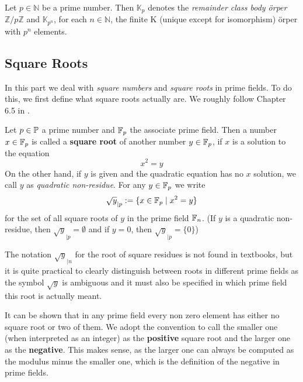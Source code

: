 \begin{definition} Let $ p \in \mathbb{N} $ be a prime number. Then $ \mathbb{K} _p $ denotes the \textit{remainder class body \"orper} $ \mathbb{ Z} / p \mathbb{Z} $ and $ \mathbb{K} _{p ^ n} $, for each $ n \in \mathbb{N} $, the finite K (unique except for isomorphism) \"orper with $ p ^ n $ elements.
\end{definition} 

\subsection{Square Roots}
In this part we deal with \textit{square numbers} and \textit{square roots} in prime fields. To do this, we first define what square roots actually are. We roughly follow Chapter 6.5 in \cite{HW}.
\begin{definition} Let
$p \in \mathbb{P} $ a prime number and $\mathbb{F}_p $ the associate prime field. Then a number $x\in \mathbb{F}_p$ is called a \textbf{square root} of another number $y\in\mathbb{F}_p$, if $x$ is a solution to the equation
\begin{equation}
x^2 = y
\end{equation}
On the other hand, if $y$ is given and the quadratic equation has no $x$ solution, we call $ y $ as \textit{quadratic non-residue}. For any $ y \in \mathbb{F}_p $ we write
\begin{equation}
\sqrt{y} _{| p}: = \{x \in \mathbb{F}_p \; | \; x^2 = y \}
\end{equation}
for the set of all square roots of $ y $ in the prime field
$ \mathbb{F}_n $. (If $ y $ is a quadratic non-residue, then $ \sqrt{y}_{| p} = \emptyset $ and if $ y = 0 $, then $ \sqrt{y}_{| p} = \{0 \} $)
\end{definition}
\begin{remark}
The notation $ \sqrt{y}_{| n} $ for the root of square residues is not found in textbooks, but it is quite practical to clearly distinguish between roots in different prime fields as the symbol $ \sqrt{y} $ is  ambiguous and it must also be specified in which prime field this root is actually meant.
\end{remark}
\begin{remark}
It can be shown that in any prime field every non zero element has either no square root or two of them. We adopt the convention to call the smaller one (when interpreted as an integer) as the \textbf{positive} square root and the larger one as the \textbf{negative}. This makes sense, as the larger one can always be computed as the modulus minus the smaller one, which is the definition of the negative in prime fields. 
\end{remark}

